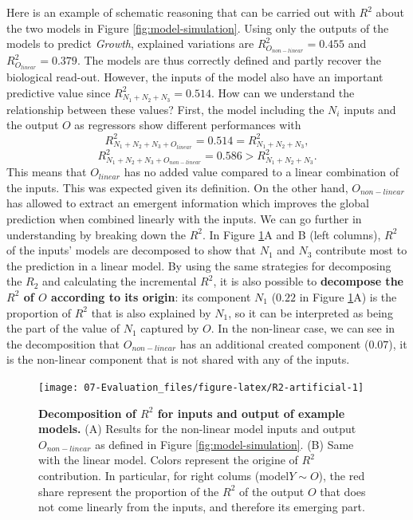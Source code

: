 \documentclass[a4paper,12pt,twoside,onecolumn,openright,final,oldfontcommands]{memoir}
\begin{document}
Here is an example of schematic reasoning that can be carried out with
\(R^2\) about the two models in Figure \ref{fig:model-simulation}. Using
only the outputs of the models to predict \emph{Growth}, explained
variations are \(R^2_{O_{non-linear}}=0.455\) and
\(R^2_{O_{linear}}=0.379\). The models are thus correctly defined and
partly recover the biological read-out. However, the inputs of the model
also have an important predictive value since
\(R^2_{N_1+N_2+N_3}=0.514\). How can we understand the relationship
between these values? First, the model including the \(N_i\) inputs and
the output \(O\) as regressors show different performances with
\[R^2_{N_1+N_2+N_3+O_{linear}}=0.514=R^2_{N_1+N_2+N_3},\]
\[R^2_{N_1+N_2+N_3+O_{non-linear}}=0.586>R^2_{N_1+N_2+N_3}.\] This means
that \(O_{linear}\) has no added value compared to a linear combination
of the inputs. This was expected given its definition. On the other
hand, \(O_{non-linear}\) has allowed to extract an emergent information
which improves the global prediction when combined linearly with the
inputs. We can go further in understanding by breaking down the \(R^2\).
In Figure \ref{fig:R2-artificial}A and B (left columns), \(R^2\) of the
inputs' models are decomposed to show that \(N_1\) and \(N_3\)
contribute most to the prediction in a linear model. By using the same
strategies for decomposing the \(R_2\) and calculating the incremental
\(R^2\), it is also possible to \textbf{decompose the \(R^2\) of \(O\)
according to its origin}: its component \(N_1\) (\(0.22\) in Figure
\ref{fig:R2-artificial}A) is the proportion of \(R^2\) that is also
explained by \(N_1\), so it can be interpreted as being the part of the
value of \(N_1\) captured by \(O\). In the non-linear case, we can see
in the decomposition that \(O_{non-linear}\) has an additional created
component (\(0.07\)), it is the non-linear component that is not shared
with any of the inputs.

\begin{figure}

{\centering \texttt{[image: 07-Evaluation\_files/figure-latex/R2-artificial-1]} 

}

\caption[Decomposition of $R^2$ for inputs and output of example models]{\textbf{Decomposition of \(R^2\) for inputs
and output of example models.} (A) Results for the non-linear model
inputs and output \(O_{non-linear}\) as defined in Figure
\ref{fig:model-simulation}. (B) Same with the linear model. Colors
represent the origine of \(R^2\) contribution. In particular, for right
colums (model\(Y\sim O\)), the red share represent the proportion of the
\(R^2\) of the output \(O\) that does not come linearly from the inputs,
and therefore its emerging part.}\label{fig:R2-artificial}
\end{figure}
\end{document}
